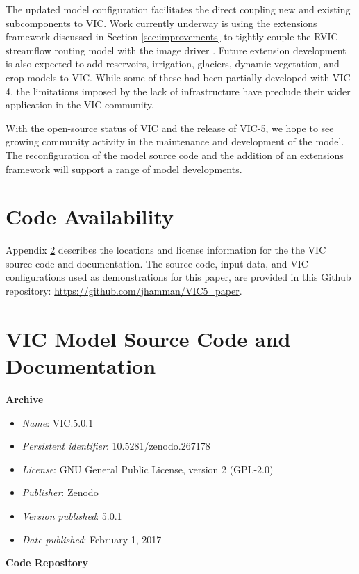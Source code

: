 \documentclass[gmd, manuscript]{copernicus}
\begin{document}
  The updated model configuration facilitates the direct coupling new and existing subcomponents to VIC.
  Work currently underway is using the extensions framework discussed in Section \ref{sec:improvements} to tightly couple the RVIC streamflow routing model with the image driver \citep{Hamman_2017a}.
  Future extension development is also expected to add reservoirs, irrigation, glaciers, dynamic vegetation, and crop models to VIC.
  While some of these had been partially developed with VIC-4, the limitations imposed by the lack of infrastructure have preclude their wider application in the VIC community.

  With the open-source status of VIC and the release of VIC-5, we hope to see growing community activity in the maintenance and development of the model.
  The reconfiguration of the model source code and the addition of an extensions framework will support a range of model developments.

\section{Code Availability}
\label{appendix:code_avail}

  Appendix \ref{appendix:source_code} describes the locations and license information for the the VIC source code and documentation.
  The source code, input data, and VIC configurations used as demonstrations for this paper, are provided in this Github repository: \url{https://github.com/jhamman/VIC5_paper}.

\appendix
\section{VIC Model Source Code and Documentation}
\label{appendix:source_code}
{\bf Archive}

\begin{itemize}
	\item \textit{Name}: VIC.5.0.1
	\item \textit{Persistent identifier}: 10.5281/zenodo.267178
	\item \textit{License}: GNU General Public License, version 2 (GPL-2.0)
	\item \textit{Publisher}:  Zenodo
	\item \textit{Version published}: 5.0.1
	\item \textit{Date published}: February 1, 2017
\end{itemize}

{\bf Code Repository}
\end{document}
